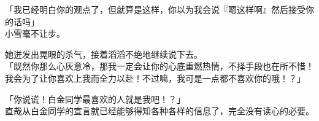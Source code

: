 「我已经明白你的观点了，但就算是这样，你以为我会说『嗯这样啊』然后接受你的话吗」\\

小雪毫不让步。

她迸发出晃眼的杀气，接着滔滔不绝地继续说下去。\\

「既然你那么心灰意冷，那我一定会让你的心底重燃热情，不择手段也在所不惜！我会为了让你喜欢上我而全力以赴！不过嘛，我可是一点都不喜欢你的哦！？」

「你说谎！白金同学最喜欢的人就是我吧！？」\\

直哉从白金同学的宣言就已经能够得知各种各样的信息了，完全没有读心的必要。
